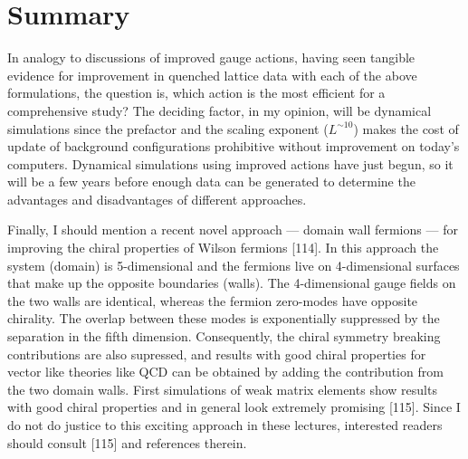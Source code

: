\section{Summary}

In analogy to discussions of improved gauge actions, having seen
tangible evidence for improvement in quenched lattice data with each of
the above formulations, the question is, which action is the most
efficient for a comprehensive study?  The deciding factor, in my
opinion, will be dynamical simulations since the prefactor and the
scaling exponent ($L^{\sim 10}$) makes the cost of update of
background configurations prohibitive without improvement on today's
computers.  Dynamical simulations using improved actions have just
begun, so it will be a few years before enough data can be generated
to determine the advantages and disadvantages of different approaches.

Finally, I should mention a recent novel approach --- domain wall
fermions --- for improving the chiral properties of Wilson fermions
[114].  In this approach the system (domain) is
5-dimensional and the fermions live on 4-dimensional surfaces that
make up the opposite boundaries (walls).  The 4-dimensional gauge
fields on the two walls are identical, whereas the fermion zero-modes
have opposite chirality.  The overlap between these modes is
exponentially suppressed by the separation in the fifth
dimension.  Consequently, the chiral symmetry breaking contributions are
also supressed, and results with good chiral properties for vector
like theories like QCD can be obtained by adding the contribution from
the two domain walls.  First simulations of weak matrix elements show
results with good chiral properties and in general look extremely
promising [115].  Since I do
not do justice to this exciting approach in these lectures, interested
readers should consult [115] and references therein.
